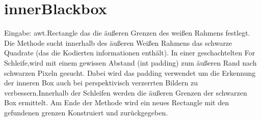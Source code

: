 \documentclass[a4paper,11pt,parskip]{article}
\begin{document}
\section{innerBlackbox}
Eingabe: awt.Rectangle das die äußeren Grenzen des weißen Rahmens festlegt.
Die Methode sucht innerhalb des äußeren Weißen Rahmens das schwarze Quadrate (das die Kodierten informationen enthält). In einer geschachtelten For Schleife,wird mit einem gewissen Abstand (int padding) zum äußeren Rand nach schwarzen Pixeln gesucht. Dabei wird das padding verwendet um die Erkennung der inneren Box auch bei perspektivisch verzerrten Bildern zu verbessern.Innerhalb der Schleifen werden die äußeren Grenzen der schwarzen Box ermittelt. Am Ende der Methode wird ein neues Rectangle mit den gefundenen grenzen Konstruiert und zurückgegeben.

\end{document}
